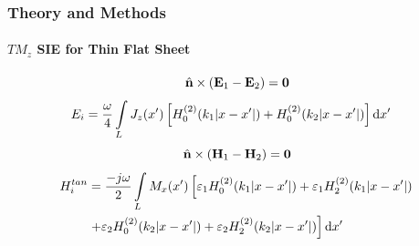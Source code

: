 \documentclass[mathserif,16pt,xcolor=table]{beamer}
\begin{document}
\begin{frame}
  \frametitle{Theory and Methods}
  \framesubtitle{$TM_z$ SIE for Thin Flat Sheet}
  \begin{equation} \nonumber
    \hat{\mathbf{n}} \times (\mathbf{E}_1 - \mathbf{E}_2) = \mathbf{0}
    \label{eq:E1bc}
  \end{equation}
  \begin{align} \nonumber
    E_i ={}& \frac{\omega}{4} \int\limits_L J_z(x') \left[ H_0^{(2)}(k_1 | x -  x'|) + H_0^{(2)}(k_2 |x - x'|)\right] \mathop{}\!\mathrm{d}{x'}  \notag
    \label{eq:scalarE}
  \end{align}
  \begin{equation} \nonumber
    \hat{\mathbf{n}} \times (\mathbf{H}_1 - \mathbf{H}_2) = \mathbf{0}
    \label{eq:E1bc}
  \end{equation}
  \begin{align} \nonumber
    H_i^{tan} &= \frac{-j \omega}{2} \int\limits_L M_x(x') \left[ \varepsilon_1 H_0^{(2)}(k_1 |x - x'|) + \varepsilon_1 H_2^{(2)}(k_1 |x - x'|) \right. \notag\\
    & \left. + \varepsilon_2 H_0^{(2)}(k_2 |x - x'|) + \varepsilon_2 H_2^{(2)}(k_2 |x - x'|)\right] \mathop{}\!\mathrm{d}{x'} \notag
    \label{eq:scalarH}
  \end{align}
\end{frame}
\end{document}
